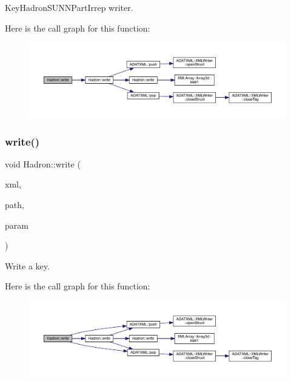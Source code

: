 Key\+Hadron\+S\+U\+N\+N\+Part\+Irrep writer. 

Here is the call graph for this function\+:\nopagebreak
\begin{figure}[H]
\begin{center}
\leavevmode
\includegraphics[width=350pt]{d1/daf/namespaceHadron_a5a34021fb508d068cf35d125eef2e1b4_cgraph}
\end{center}
\end{figure}
\mbox{\label{namespaceHadron_a536d0c7d1bd20e64ba84b0588b3696f9}} 
\subsubsection{\texorpdfstring{write()}{write()}\hspace{0.1cm}{\footnotesize\ttfamily [33/95]}}
{\footnotesize\ttfamily void Hadron\+::write (\begin{DoxyParamCaption}\item[{\mbox{\hyperlink{classADATXML_1_1XMLWriter}{X\+M\+L\+Writer}} \&}]{xml,  }\item[{const std\+::string \&}]{path,  }\item[{const \mbox{\hyperlink{structHadron_1_1KeySingleHadronQuarkSpin__t}{Key\+Single\+Hadron\+Quark\+Spin\+\_\+t}} \&}]{param }\end{DoxyParamCaption})}



Write a key. 

Here is the call graph for this function\+:\nopagebreak
\begin{figure}[H]
\begin{center}
\leavevmode
\includegraphics[width=350pt]{d1/daf/namespaceHadron_a536d0c7d1bd20e64ba84b0588b3696f9_cgraph}
\end{center}
\end{figure}
\mbox{\label{namespaceHadron_a38af8457b328042ae00ad011656edc71}} 
